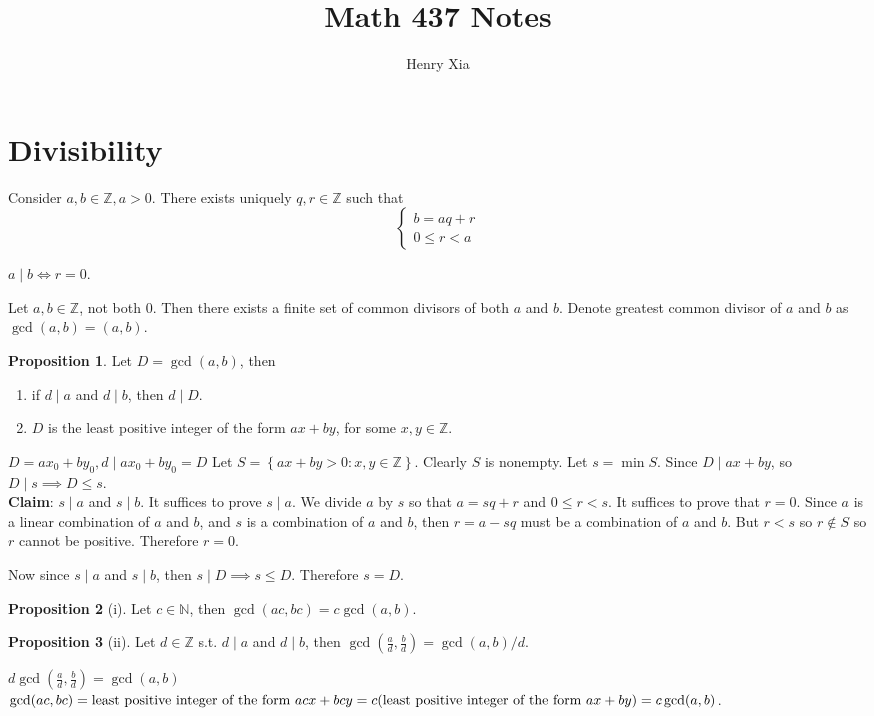 \documentclass[11pt]{article}
\title{Math 437 Notes}
\author{Henry Xia}
\theoremstyle{definition}
\newtheorem{prop}{Proposition}[section]
\newcommand{\The}[2]{\begin{#1}#2\end{#1}}
\newcommand{\f}[2]{\frac{#1}{#2}}
\newcommand{\set}[1]{\left\{ #1 \right\}}
\newcommand{\ZZ}{\mathbb{Z}}
\newcommand{\NN}{\mathbb{N}}
\begin{document}
\maketitle

\tableofcontents

\section{Divisibility}
Consider $a,b\in\ZZ, a>0$. There exists uniquely $q,r\in\ZZ$ such that 
$$ \begin{cases} b = aq+r \\ 0 \le r < a \end{cases} $$
\The{cor}{
	$a \mid b \iff r=0$. 
}

\The{defn} { 
	Let $a,b\in\ZZ$, not both 0. Then there exists a finite set of common divisors of both $a$ and $b$.
	Denote greatest common divisor of $a$ and $b$ as $\gcd(a,b) = (a,b)$.
}

\begin{prop} Let $D = \gcd(a,b)$, then 
\begin{enumerate}
	\item if $d \mid a$ and $d \mid b$, then $d \mid D$.
	\item $D$ is the least positive integer of the form $ax+by$, for some $x,y\in\ZZ$.
\end{enumerate}
\end{prop}
 $D = ax_0+by_0, d \mid ax_0+by_0 = D$
\proof [Proof of $(2)$] Let $S = \set{ax + by > 0 : x,y \in \ZZ}$. Clearly $S$ is nonempty. Let $s = \min S$. Since $D \mid ax+by$, so $D\mid s \implies D \le s$. \\
\textbf{Claim}: $s\mid a$ and $s\mid b$. It suffices to prove $s\mid a$. We divide $a$ by $s$ so that $a = sq+r$ and $0\le r < s$. It suffices to prove that $r=0$. Since $a$ is a linear combination of $a$ and $b$, and $s$ is a combination of $a$ and $b$, then $r = a-sq$ must be a combination of $a$ and $b$. But $r < s$ so $r \notin S$ so $r$ cannot be positive. Therefore $r=0$.

Now since $s\mid a$ and $s\mid b$, then $s \mid D \implies s \le D$. Therefore $s = D$.
\qedhere

\begin{prop}[i] 
Let $c\in\NN$, then $\gcd(ac,bc) = c\gcd(a,b)$.
\end{prop}
\begin{prop}[ii]
Let $d\in\ZZ$ s.t. $d\mid a$ and $d\mid b$, then $\gcd\left(\f{a}{d}, \f{b}{d}\right) = \gcd(a,b)/d$.
\end{prop}
 $d\gcd\left(\f{a}{d}, \f{b}{d}\right) = \gcd(a,b)$
\proof [Proof of $(1)$] $\gcd(ac,bc) = \text{least positive integer of the form } acx + bcy \\ = c(\text{least positive integer of the form } ax+by) = c\gcd(a,b)$.
\qedhere
\end{document}
